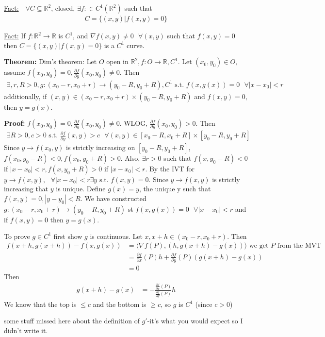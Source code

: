 \documentclass{article}
\newcommand*{\txt}[1]{\text{ #1 }}%
\newcommand*{\iprod}[1]{\langle #1 \rangle}
\newcommand*{\fora}{\txt{}\forall}%
\newcommand*{\rr}{\mathbb{R}}%
\newcommand*{\partials}[2]{\frac{\partial #1}{\partial #2}}%
\begin{document}
\underline{Fact:} $\fora C\subseteq \rr^2$, closed, $\exists f:\in C^1(\rr^2)$ such that \begin{align*}
    C=\{(x,y)|f(x,y)=0\}
\end{align*}

\underline{Fact:} If $f:\rr^2\to \rr$ is $C^1$, and $\nabla f(x,y)\neq 0\fora (x,y)$ such that $f(x,y)=0$ then $C=\{(x,y)|f(x,y)=0\}$ is a $C^1$ curve.

\textbf{Theorem:} Dim's theorem: Let $O$ open in $\rr^2, f:O\to \rr, C^1$. Let $(x_0,y_0)\in O$, assume $f(x_0,y_0)=0, \partials{f}{y}(x_0,y_0)\neq 0$. Then \begin{align*}
    \exists, r,R>0,g:(x_0-r,x_0+r)\to (y_0-R,y_0+R), C^1\txt{s.t.}f(x,g(x))=0\fora |x-x_0|<r
\end{align*}additionally, if $(x,y)\in (x_0-r,x_0+r)\times (y_0-R,y_0+R)$ and $f(x,y)=0$, then $y=g(x)$.

\textbf{Proof:} $f(x_0,y_0)=0, \partials{f}{y}(x_0,y_0)\neq 0$. WLOG, $\partials{f}{y}(x_0,y_0)>0$. Then \begin{align*}
    \exists R>0, c>0\txt{s.t.}\partials{f}{y}(x,y)>c\fora (x,y)\in [x_0-R,x_0+R]\times [y_0-R,y_0+R]
\end{align*}Since $y\to f(x_0,y)$ is strictly increasing on $[y_0-R, y_0+R]$, $f(x_0,y_0-R)<0, f(x_0, y_0+R)>0$. Also, $\exists r>0$ such that $f(x,y_0-R)<0$ if $|x-x_0|<r, f(x,y_0+R)>0$ if $|x-x_0|<r$. By the IVT for $y\to f(x,y), \fora |x-x_0|<r \exists y\txt{s.t.}f(x,y)=0$. Since $y\to f(x,y)$ is strictly increasing that $y$ is unique. Define $g(x)=y$, the unique y such that $f(x,y)=0, |y-y_0|<R$. We have constructed $g:(x_0-r,x_0+r)\to (y_0-R,y_0+R)$ st $f(x,g(x))=0\fora |x-x_0|<r$ and if $f(x,y)=0$ then $y=g(x)$.

To prove $g\in C^1$ first show $g$ is continuous. Let $x,x+h\in (x_0-r, x_0+r)$. Then \begin{align*}
    f(x+h,g(x+h))-f(x,g(x))&=\iprod{\nabla f(P),(h,g(x+h)-g(x))}\txt{we get $P$ from the MVT}\\
    &=\partials{f}{x}(P)h+\partials{f}{y}(P)(g(x+h)-g(x))\\
    &=0
\end{align*}Then \begin{align*}
    g(x+h)-g(x)&=-\frac{\partials{f}{x}(P)}{\partials{f}{y}(P)}h
\end{align*}We know that the top is $\leq c$ and the bottom is $\geq c$, so $g$ is $C^1$ (since $c>0$)

some stuff missed here about the definition of $g'$-it's what you would expect so I didn't write it.
\end{document}
